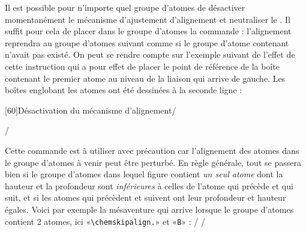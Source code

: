\documentclass[10pt,french]{article}
\makeatletter
\newcommand\make@car@active[1]{%
	\catcode`#1\active
	\begingroup
		\lccode`\~`#1\relax
		\lowercase{\endgroup\def~}%
}
\newif\if@exstar
\newcommand\exemple{%
	\begingroup
	\parskip\z@
	\@makeother\;\@makeother\!\@makeother\?\@makeother\:%
	\@ifstar{\@exstartrue\exemple@}{\@exstarfalse\exemple@}}
\newcommand\exemple@[2][65]{%
	\medbreak\noindent
	\begingroup
		\let\do\@makeother\dospecials
		\make@car@active\ { {}}%
		\make@car@active\^^M{\par\leavevmode}%
		\make@car@active\^^I{\space\space}%
		\make@car@active\,{\leavevmode\kern\z@\string,}%
		\make@car@active\-{\leavevmode\kern\z@\string-}%
		\make@car@active\>{\leavevmode\kern\z@\string>}%
		\make@car@active\<{\leavevmode\kern\z@\string<}%
		\exemple@@{#1}{#2}%
}
\newcommand\exemple@@[3]{%
	\def\@tempa##1#3{\exemple@@@{#1}{#2}{##1}}%
	\@tempa
}
\newcommand\exemple@@@[3]{%
	\xdef\the@code{#3}%
	\endgroup
	\if@exstar
		\begingroup
			\fboxrule0.4pt
			\let\breakboxparindent\z@
			\def\bkvz@bottom{\hrule\@height\fboxrule}%
			\let\bkvz@before@breakbox\relax
			\def\bkvz@set@linewidth{\advance\linewidth\dimexpr-2\fboxrule-2\fboxsep}%
			\def\bkvz@left{\vrule\@width\fboxrule\hskip\fboxsep}%
			\def\bkvz@right{\hskip\fboxsep\vrule\@width\fboxrule}%
			\def\bkvz@top{\hbox to \hsize{%
				\vrule\@width\fboxrule\@height\fboxrule
				\leaders\bkvz@bottom\hfill
				\sffamily
				\fboxsep\z@
				\colorbox{black}{\kern0.25em\color{white}\footnotesize\lower0.5ex\hbox{\strut#2}\kern0.25em}%
				\leaders\bkvz@bottom\hfill
				\vrule\@width\fboxrule\@height\fboxrule}}%
			\breakbox
				\kern.5ex\relax
				\ttfamily\footnotesize\the@code\par
				\normalfont
				\kern3pt
				\hrule height0.1pt width\linewidth depth0.1pt
				\vskip5pt
				\rightskip0pt plus 1fill
				\everypar{{\color{lightgray}\rlap{\vrule height0.1pt width\linewidth depth0.1pt}}\hskip0pt plus 1fill}%
				\newlinechar`\^^M\everyeof{\noexpand}\scantokens{#3}\par
			\endbreakbox
		\endgroup
	\else
		\vskip0.5ex
		\boxput*(0,1)
			{\fboxsep\z@
			\hbox{\sffamily\colorbox{black}{\leavevmode\kern0.25em{\color{white}\footnotesize\strut#2}\kern0.25em}}%
			}%
			{\fboxsep5pt
			\fbox{%
				$\vcenter{\hsize\dimexpr0.#1\linewidth-\fboxsep-\fboxrule\relax
					\kern5pt\parskip0pt \ttfamily\footnotesize\the@code}%
				\vcenter{\kern5pt\hsize\dimexpr\linewidth-0.#1\linewidth-\fboxsep-\fboxrule\relax
					\everypar{{\color{lightgray}\rlap{\vrule height0.1pt width\dimexpr\linewidth-0.#1\linewidth-\fboxsep-\fboxrule depth0.1pt}}}%
					\footnotesize\newlinechar`\^^M\everyeof{\noexpand}\scantokens{#3}}$%
				}%
			}%
	\fi
	\medbreak
	\endgroup
}
\newcommand\falseverb[1]{{\ttfamily\detokenize\expandafter{\string#1}}}
\let\do\@makeother\dospecials
\makeatother
\begin{document}
\label{chemskipalign}Il est possible pour n'importe quel groupe d'atomes de désactiver momentanément le mécanisme d'ajustement d'alignement et neutraliser le \falseverb\vphantom. Il suffit pour cela de placer dans le groupe d'atomes la commande \falseverb{\chemskipalign} : l'alignement reprendra au groupe d'atomes suivant comme si le groupe d'atome contenant \falseverb{\chemskipalign} n'avait pas existé. On peut se rendre compte sur l'exemple suivant de l'effet de cette instruction qui a pour effet de placer le point de référence de la boîte contenant le premier atome au niveau de la liaison qui arrive de gauche. Les boîtes englobant les atomes ont été dessinées à la seconde ligne :

\exemple[60]{Désactivation du mécanisme d'alignement}/\large
{}\quad
{}\par\bigskip
\fboxsep=0pt
\renewcommand\printatom[1]{\fbox{\ensuremath{\mathrm{#1}}}}
\quad
{}/

Cette commande est à utiliser avec précaution car l'alignement des atomes dans le groupe d'atomes à venir peut être perturbé. En règle générale, tout se passera bien si le groupe d'atomes dans lequel figure \falseverb{\chemskipalign} contient \emph{un seul atome} dont la hauteur et la profondeur sont \emph{inférieures} à celles de l'atome qui précède et qui suit, et si les atomes qui précèdent et suivent ont leur profondeur et hauteur égales. Voici par exemple la mésaventure qui arrive lorsque le groupe d'atomes contient 2 atomes, ici «\verb-\chemskipalign.-» et «\verb-B-» :
\exemple{Conséquence de la commande \string\chemskipalign}/\large
\fboxsep=0pt
\renewcommand\printatom[1]{\fbox{\ensuremath{\mathrm{#1}}}}
/
\end{document}
